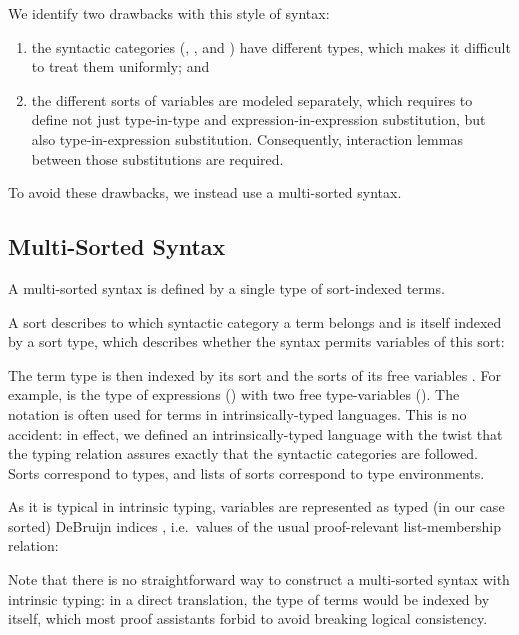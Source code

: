 \documentclass[a4paper, UKenglish, cleveref, autoref, thm-restate]{lipics-v2021}
\newenvironment{LibCode*}{%
  \begin{tcolorbox}[%
    colframe=white,%
    boxrule=0.0pt,%
    top=2.5pt,%
    left=2.5pt,%
    bottom=2.5pt,%
    right=2.5pt,%
    before skip=5pt,%
    after skip=5pt,%
    boxsep=0pt%
  ]
}{%
  \end{tcolorbox}%
}
\newcommand*\LibCode[1]{\begin{LibCode*}{#1}\end{LibCode*}}
\newcommand*\AppCode[1]{{#1}}
\newcommand*\ACode[1]{\AgdaFontStyle{\textcolor{mygray}{#1}}}
\newcommand*\ACon[1]{\AgdaInductiveConstructor{#1}}
\begin{document}
  We identify two drawbacks with this style of syntax:
  \begin{enumerate}
  \item
    the syntactic categories (\ACode{\ACon{Kind}},
    \ACode{\ACon{Type}}, and \ACode{\ACon{Expr}})
    have different types, which makes it difficult to treat them uniformly; and
  \item the different sorts of variables are modeled separately, which requires to define not just
    type-in-type and expression-in-expression substitution, but also type-in-expression substitution.
    Consequently, interaction lemmas between those substitutions are required.
  \end{enumerate}
  To avoid these drawbacks, we instead use a multi-sorted syntax.

  \subsection{Multi-Sorted Syntax}
  \label{sec:syntax:multi}
  A multi-sorted syntax is defined by a single type of sort-indexed terms.

  A sort describes to which syntactic category a term belongs and is
  itself indexed by a sort type, which describes whether the syntax
  permits variables of this sort:
  \LibCode\KSortTy
  \AppCode\FSort
  
  The term type \ACode{S \ACon{⊢} s} is then indexed by its sort
  \ACode{s} and the sorts of its free variables \ACode{S}.
  For example, \ACode{\ACon{[𝕥, 𝕥] ⊢ 𝕖}} is the type of expressions
  (\ACode{\ACon{𝕖}}) with two free type-variables (\ACode{\ACon{𝕥}}).
  \AppCode\FSyntax
  The notation \ACode{\ACon{\_⊢\_}} is often used for terms in
  intrinsically-typed languages. This is no accident: in effect, we
  defined an intrinsically-typed language with the twist that the
  typing relation assures exactly that the syntactic categories are followed.
  Sorts \ACode{s} correspond to types, and lists of sorts \ACode{S}
  correspond to type environments.

  As it is typical in intrinsic typing, variables are represented as
  typed (in our case sorted) DeBruijn indices \ACode{S \ACon{∋} s}, i.e.\
  values of the usual proof-relevant list-membership relation:
  \LibCode\KVariables

  Note that there is no straightforward way to construct a
  multi-sorted syntax with intrinsic typing: in a direct translation,
  the type of terms \ACode{\ACon{\_⊢\_}} would be indexed by itself, which
  most proof assistants forbid to avoid breaking logical consistency.
\end{document}
